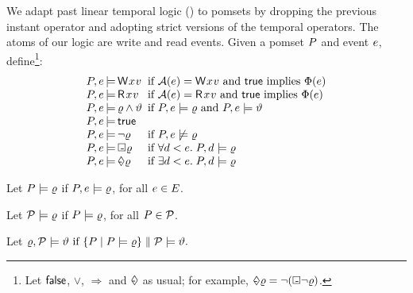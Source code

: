 We adapt past linear temporal logic (\pLTL)
\cite{Lichtenstein:1985:GP:648065.747612} to pomsets by dropping the previous
instant operator and adopting strict versions of the temporal operators.
The atoms of our logic are write and read events.
Given a pomset $P$ and event $e$, define\footnote{Let $\mathsf{false}$, $\lor$,
  $\Rightarrow$ and $\Diamond\mkern-10.1mu\text{-}\mkern4mu$ as usual;
  for example,
  $\Diamond\mkern-10.1mu\text{-}\mkern4mu\varrho = \lnot(\Box\mkern-8.8mu\text{-}\mkern3mu\lnot\varrho)$.}:
\begin{displaymath}
  \renewcommand{\arraycolsep}{.2ex}
    \begin{array}{lrll}
      \aPS,\aEv &\models& \DW{\aLoc}{\aVal} &\text{ if } \labelingAct(\aEv) = \DW{\aLoc}{\aVal} \text{ and } \TRUE \text{ implies } \labelingForm(\aEv) \\
      \aPS,\aEv &\models& \DR{\aLoc}{\aVal} &\text{ if } \labelingAct(\aEv) = \DR{\aLoc}{\aVal} \text{ and } \TRUE \text{ implies } \labelingForm(\aEv) \\
      \aPS,\aEv &\models& \afo\land\bfo &\text{ if } \aPS,\aEv \models  \afo \text{ and } \aPS,\aEv \models  \bfo \\
      \aPS,\aEv &\models& \TRUE\\
      \aPS,\aEv &\models& \lnot\afo &\text{ if } \aPS,\aEv \not\models \afo \\
      \aPS,\aEv &\models& \always\afo &\text{ if } \forall \bEv \lt \aEv.\; \aPS,\bEv \models \afo\\
      \aPS,\aEv &\models& \once\afo &\text{ if } \exists \bEv \lt \aEv.\;  \aPS,\bEv \models \afo 
    \end{array} 
  \end{displaymath}

  Let $P \models \varrho$ if
  $P,e \models\varrho$, for all $e \in E$.

  Let $\mathcal{P}\models \varrho$
  if $P \models\varrho$, for all $P \in \mathcal{P}$.
  
Let
  \begin{math}
    \varrho, \mathcal{P} \models \vartheta  \text{ if } \{ P \mid P \models \varrho \} \parallel \mathcal{P} \models \vartheta.
  \end{math}

